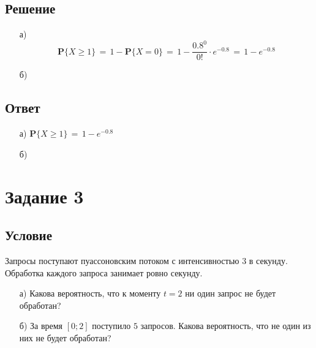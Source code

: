 \documentclass{article}
\begin{document}
\subsection*{Решение}
\begin{enumerate}
\item[а)]
\[ \mathbf{P} \big\{ X \! \geqslant \! 1 \big\} \, = \, 1 \! - \! \mathbf{P} \big\{ X \! = \! 0 \big\} \, = \, 1 \! - \! \dfrac{0.8^0}{0!} \! \cdot \! e^{-0.8} \, = \, 1 \! - \! e^{-0.8}  \]
\item[б)]
\end{enumerate}
\subsection*{Ответ}
\begin{enumerate}
\item[а)] $ \mathbf{P} \big\{ X \! \geqslant \! 1 \big\} \, = \, 1 \! - \! e^{-0.8} $
\item[б)]
\end{enumerate}
\section*{Задание 3}
\subsection*{Условие}
Запросы поступают пуассоновским потоком с интенсивностью $ 3 $ в секунду. Обработка каждого запроса занимает ровно секунду.
\begin{enumerate}
\item[а)] Какова вероятность, что к моменту $ t \! = \! 2 $ ни один запрос не будет обработан?
\item[б)] За время $ [0;2] $ поступило $ 5 $ запросов. Какова вероятность, что не один из них не будет обработан?
\end{enumerate}
\end{document}
